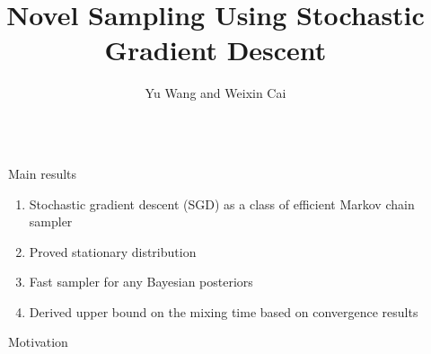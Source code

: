 \documentclass[final]{beamer}
\title{Novel Sampling Using Stochastic Gradient Descent} %
\author{Yu Wang and Weixin Cai} %
\institute{Department of Statistics, UC Berkeley} %
\newlength{\sepwid}
\newlength{\onecolwid}
\begin{document}

\setlength{\belowcaptionskip}{2ex} %
\setlength\belowdisplayshortskip{2ex} %

\begin{frame}[t] %

\begin{columns}[t] %

\begin{column}{\sepwid}\end{column} %

\begin{column}{\onecolwid} %


\begin{alertblock}{Main results}


\begin{enumerate}
\item Stochastic gradient descent (SGD) as a class of efficient Markov chain sampler
\item Proved stationary distribution
\item Fast sampler for any Bayesian posteriors
\item Derived upper bound on the mixing time based on convergence results
\end{enumerate}

\end{alertblock}


\begin{block}{Motivation}


\end{block}
\end{column}
\end{columns}
\end{frame}
\end{document}
